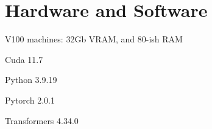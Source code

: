 \section{Hardware and Software}
\list{-}
    \item V100 machines: 32Gb VRAM, and 80-ish RAM
    \item Cuda 11.7
    \item Python 3.9.19
    \item Pytorch 2.0.1
    \item Transformers 4.34.0

